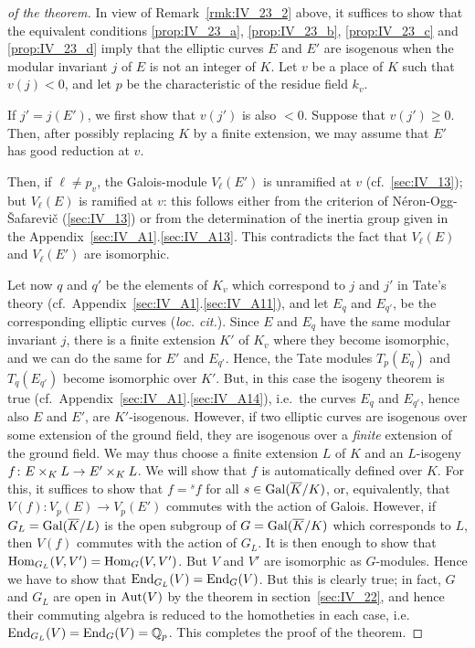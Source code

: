 \begin{proof}[ of the theorem]
In view of Remark~\ref{rmk:IV_23_2} above, it suffices to show that the
equivalent conditions \ref{prop:IV_23_a}, \ref{prop:IV_23_b},
\ref{prop:IV_23_c} and \ref{prop:IV_23_d} imply that the elliptic curves $E$
and $E'$ are isogenous when the modular invariant $j$ of $E$ is not an integer
of $K$. Let $v$ be a place of $K$ such that $v(j) < 0$, and let $p$ be the
characteristic of the residue field $k_v$.

If $j' = j(E')$, we first show that $v(j')$ is also $< 0$. Suppose
that $v(j') \ge 0$. Then, after possibly replacing $K$ by a finite
extension, we may assume that $E'$ has good reduction at $v$.

Then, if $\ell \ne p_v$, the Galois-module $V_\ell(E')$ is unramified at $v$
(cf.\ \ref{sec:IV_13}); but $V_\ell(E)$ is ramified at $v$: this follows either
from the criterion of Néron-Ogg-\v Safarevi\v c (\ref{sec:IV_13}) or from the
determination of the inertia group given in the
Appendix~\ref{sec:IV_A1}.\ref{sec:IV_A13}. This contradicts the fact that
$V_\ell(E)$ and $V_\ell(E')$ are isomorphic.

Let now $q$ and $q'$ be the elements of $K_v$ which correspond to $j$ and $j'$
in Tate's theory (cf.\ Appendix~\ref{sec:IV_A1}.\ref{sec:IV_A11}), and let
$E_q$ and $E_{q'}$, be the corresponding elliptic curves (\emph{loc. cit.}).
Since $E$ and $E_q$ have the same modular invariant $j$, there is a finite
extension $K'$ of $K_v$ where they become isomorphic, and we can do the same
for $E'$ and $E_{q'}$. Hence, the Tate modules $T_p(E_q)$ and $T_q(E_{q'})$
become isomorphic over $K'$. But, in this case the isogeny
\dpage
theorem is true (cf.\ Appendix~\ref{sec:IV_A1}.\ref{sec:IV_A14}), i.e.\ the
curves $E_q$ and $E_{q'}$, hence also $E$ and $E'$, are $K'$-isogenous.
However, if two elliptic curves are isogenous over some extension of the ground
field, they are isogenous over a \emph{finite} extension of the ground field.
We may thus choose a finite extension $L$ of $K$ and an $L$-isogeny $f\colon E
\times_K L \to E' \times_K L$. We will show that $f$ is automatically defined
over $K$. For this, it suffices to show that $f = {}^sf$ for all
$s\in\operatorname{Gal}(\overline{K}/K)$, or, equivalently, that $V(f)\colon V_p(E) \to V_p(E')$
commutes with the action of Galois. However, if $G_L = \operatorname{Gal}(\overline{K}/L)$ is
the open subgroup of $G = \operatorname{Gal}(\overline{K}/K)$ which corresponds to $L$, then
$V(f)$ commutes with the action of $G_L$. It is then enough to show that
$\operatorname{Hom}_{G_L}(V, V') = \operatorname{Hom}_G(V, V')$. But $V$ and $V'$ are isomorphic as
$G$-modules. Hence we have to show that $\operatorname{End}_{G_L}(V) = \operatorname{End}_G(V)$. But
this is clearly true; in fact, $G$ and $G_L$ are open in $\operatorname{Aut}(V)$ by the
theorem in section~\ref{sec:IV_22}\label{errata:wrongsec}, and hence their
commuting algebra is reduced to the homotheties in each case, i.e.\
$\operatorname{End}_{G_L}(V) = \operatorname{End}_G(V) = \mathbb{Q}_p$.
This completes the proof of the theorem.
\end{proof}

